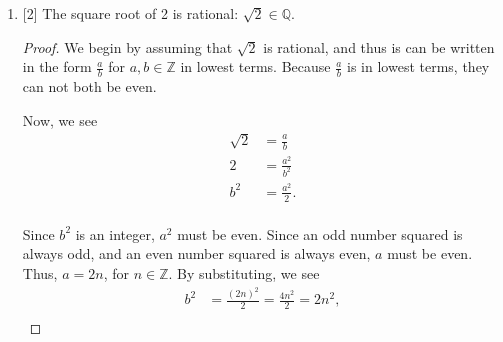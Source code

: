 \documentclass{article}
\begin{document}
\begin{enumerate}
{\begin{proof}
            We continue by first proving \(10 \mid n \Rightarrow 100 \mid n^3\). 

            By using modular arithmetic, we see:
            \begin{align*}
                n &\equiv 0 \pmod{10}\\
                n^2 &\equiv 0 \pmod{100}\\
                n^3 &\equiv 0 \pmod{1000}.\\
            \end{align*}

            Since \(100 \equiv 0 \pmod{1000}\) and \(n^3 \equiv 0 \pmod{1000}\),
            \(n^3 \equiv 0 \pmod{100}\). So, \(100 \mid n^3\). 
            
            Therefore, \(n \mid 10 \Rightarrow n^3 \mid 100\).

            Now, to see that \(100 \mid n^3 \Rightarrow 10 \mid n\), we first 
            suppose \(100 \mid n^3\). Then, we see that \(4 \mid n^3\) and \(25 \mid n^3\).

            Thus, \(2 \mid n^3\) and \(2 \mid n\). Also, \(5 \mid n^3\) and \(5 \mid n\). 

            Since \(2 \mid n\) and \(5 \mid n\), \(10 \mid n\). 

            Therefore, \(10 \mid n\) if and only if \(100 \mid n^3\).
        \end{proof}
    }

    \item {
        [2] The square root of 2 is rational: \(\sqrt{2} \in \mathbb{Q }\).

        \begin{proof}
            We begin by assuming that \(\sqrt{2}\) is rational, and thus is can 
            be written in the form \(\frac{a }{b}\) for \(a, b \in \mathbb{Z}\)
            in lowest terms. Because \(\frac{a}{b}\) is in lowest terms, 
            they can not both be even. 

            Now, we see
            \begin{align*}
                \sqrt{2} &= \frac{a }{b } \\
                2 &= \frac{a^2}{b^2}\\
                b^2 &= \frac{a^2}{2}.\\
            \end{align*}

            Since \(b^2\) is an integer, \(a^2\) must be even. Since an odd number 
            squared is always odd, and an even number squared is always even, 
            \(a\) must be even. Thus, \(a = 2n\), for \(n \in \mathbb{Z}\).
            By substituting, we see 
            \begin{align*}
                b^2 &= \frac{(2n)^2}{2} = \frac{4n^2}{2} = 2n^2,\\
            \end{align*}


\end{proof}}
\end{enumerate}
\end{document}
